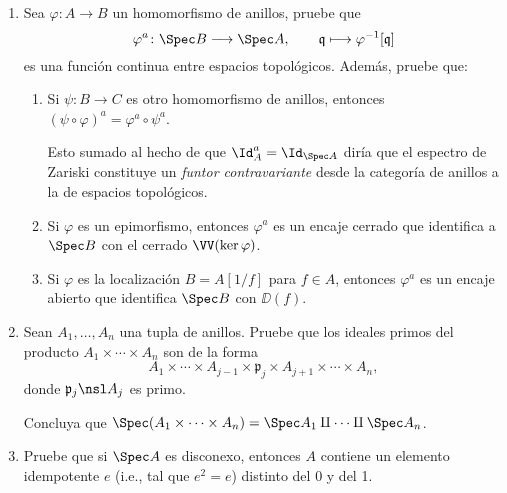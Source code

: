 \documentclass[11pt, reqno]{amsart}
\begin{document}
\begin{enumerate}
\begin{enumerate}[resume]
		\end{enumerate}
	\item Sea $\varphi \colon A \to B$ un homomorfismo de anillos, pruebe que
		\[
			\varphi^a \colon \Spec B \longrightarrow \Spec A, \qquad
			\mathfrak{q} \longmapsto \varphi^{-1}[\mathfrak{q}]
		\]
		es una función continua entre espacios topológicos.
		Además, pruebe que:
		\begin{enumerate}
			\item Si $\psi \colon B \to C$ es otro homomorfismo de anillos, entonces $(\psi\circ \varphi)^a
				= \varphi^a\circ \psi^a$.
				
				\lookup
				Esto sumado al hecho de que $\Id_A^a = \Id_{\Spec A}$ diría que el espectro de Zariski
				constituye un \emph{funtor contravariante} desde la categoría de anillos a la de
				espacios topológicos.
			\item Si $\varphi$ es un epimorfismo, entonces $\varphi^a$ es un encaje cerrado que identifica a
				$\Spec B$ con el cerrado $\VV(\ker\varphi)$.
			\item Si $\varphi$ es la localización $B = A[1/f]$ para $f \in A$, entonces $\varphi^a$ es un
				encaje abierto que identifica $\Spec B$ con $\DD(f)$.
		\end{enumerate}
	\item Sean $A_1, \dots, A_n$ una tupla de anillos.
		Pruebe que los ideales primos del producto $A_1 \times \cdots \times A_n$ son de la forma
		\[
			A_1 \times \cdots \times A_{j-1} \times \mathfrak{p}_j \times A_{j+1} \times \cdots \times A_n,
		\]
		donde $\mathfrak{p}_j \nsl A_j$ es primo.

		Concluya que $\Spec(A_1 \times \cdots \times A_n) = \Spec A_1 \amalg \cdots \amalg \Spec A_n$.
	\item Pruebe que si $\Spec A$ es disconexo, entonces $A$ contiene un elemento idempotente $e$ (i.e.,
		tal que $e^2 = e$) distinto del 0 y del 1.

\end{enumerate}

\printbibliography
\end{document}
